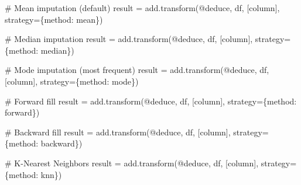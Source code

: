 \documentclass[
  letterpaper,
]{scrbook}
\newenvironment{Shaded}{\begin{snugshade}}{\end{snugshade}}
\newcommand{\CommentTok}[1]{\textcolor[rgb]{0.37,0.37,0.37}{#1}}
\newcommand{\NormalTok}[1]{\textcolor[rgb]{0.00,0.23,0.31}{#1}}
\newcommand{\OperatorTok}[1]{\textcolor[rgb]{0.37,0.37,0.37}{#1}}
\newcommand{\StringTok}[1]{\textcolor[rgb]{0.13,0.47,0.30}{#1}}
\begin{document}
\begin{Shaded}
\begin{Highlighting}[]
\CommentTok{\# Mean imputation (default)}
\NormalTok{result }\OperatorTok{=}\NormalTok{ add.transform(}\StringTok{\textquotesingle{}@deduce\textquotesingle{}}\NormalTok{, df, [}\StringTok{\textquotesingle{}column\textquotesingle{}}\NormalTok{], strategy}\OperatorTok{=}\NormalTok{\{}\StringTok{\textquotesingle{}method\textquotesingle{}}\NormalTok{: }\StringTok{\textquotesingle{}mean\textquotesingle{}}\NormalTok{\})}

\CommentTok{\# Median imputation}
\NormalTok{result }\OperatorTok{=}\NormalTok{ add.transform(}\StringTok{\textquotesingle{}@deduce\textquotesingle{}}\NormalTok{, df, [}\StringTok{\textquotesingle{}column\textquotesingle{}}\NormalTok{], strategy}\OperatorTok{=}\NormalTok{\{}\StringTok{\textquotesingle{}method\textquotesingle{}}\NormalTok{: }\StringTok{\textquotesingle{}median\textquotesingle{}}\NormalTok{\})}

\CommentTok{\# Mode imputation (most frequent)}
\NormalTok{result }\OperatorTok{=}\NormalTok{ add.transform(}\StringTok{\textquotesingle{}@deduce\textquotesingle{}}\NormalTok{, df, [}\StringTok{\textquotesingle{}column\textquotesingle{}}\NormalTok{], strategy}\OperatorTok{=}\NormalTok{\{}\StringTok{\textquotesingle{}method\textquotesingle{}}\NormalTok{: }\StringTok{\textquotesingle{}mode\textquotesingle{}}\NormalTok{\})}

\CommentTok{\# Forward fill}
\NormalTok{result }\OperatorTok{=}\NormalTok{ add.transform(}\StringTok{\textquotesingle{}@deduce\textquotesingle{}}\NormalTok{, df, [}\StringTok{\textquotesingle{}column\textquotesingle{}}\NormalTok{], strategy}\OperatorTok{=}\NormalTok{\{}\StringTok{\textquotesingle{}method\textquotesingle{}}\NormalTok{: }\StringTok{\textquotesingle{}forward\textquotesingle{}}\NormalTok{\})}

\CommentTok{\# Backward fill}
\NormalTok{result }\OperatorTok{=}\NormalTok{ add.transform(}\StringTok{\textquotesingle{}@deduce\textquotesingle{}}\NormalTok{, df, [}\StringTok{\textquotesingle{}column\textquotesingle{}}\NormalTok{], strategy}\OperatorTok{=}\NormalTok{\{}\StringTok{\textquotesingle{}method\textquotesingle{}}\NormalTok{: }\StringTok{\textquotesingle{}backward\textquotesingle{}}\NormalTok{\})}

\CommentTok{\# K{-}Nearest Neighbors}
\NormalTok{result }\OperatorTok{=}\NormalTok{ add.transform(}\StringTok{\textquotesingle{}@deduce\textquotesingle{}}\NormalTok{, df, [}\StringTok{\textquotesingle{}column\textquotesingle{}}\NormalTok{], strategy}\OperatorTok{=}\NormalTok{\{}\StringTok{\textquotesingle{}method\textquotesingle{}}\NormalTok{: }\StringTok{\textquotesingle{}knn\textquotesingle{}}\NormalTok{\})}


\end{Highlighting}
\end{Shaded}
\end{document}
